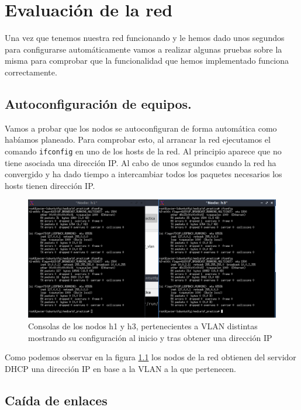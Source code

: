 \chapter{Evaluación de la red}

Una vez que tenemos nuestra red funcionando y le hemos dado unos segundos para configurarse automáticamente vamos a realizar algunas pruebas sobre la misma para comprobar que la funcionalidad que hemos implementado funciona correctamente.

\section{Autoconfiguración de equipos.}

Vamos a probar que los nodos se autoconfiguran de forma automática como habíamos planeado. Para comprobar esto, al arrancar la red ejecutamos el comando \lstinline{ifconfig} en uno de los hosts de la red. Al principio aparece que no tiene asociada una dirección IP. Al cabo de unos segundos cuando la red ha convergido y ha dado tiempo a intercambiar todos los paquetes necesarios los hosts tienen dirección IP.

\begin{figure}[!h]
    \centering
    \includegraphics[width=\textwidth]{imagenes/figuras/autoconfig.png}
    \caption{Consolas de los nodos h1 y h3, pertenecientes a VLAN distintas mostrando su configuración al inicio y tras obtener una dirección IP}
    \label{fig:autoconfig}
\end{figure}

Como podemos observar en la figura \ref{fig:autoconfig} los nodos de la red obtienen del servidor DHCP una dirección IP en base a la VLAN a la que pertenecen. 

\section{Caída de enlaces}


